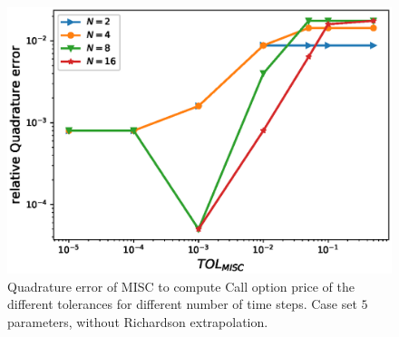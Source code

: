 \documentclass[11pt]{article}
\begin{document}
	\begin{figure}[h!]
		\centering
		\includegraphics[width=0.7\linewidth]{./figures/rBergomi_MISC_quadratre_error/vs_TOL/set5/relative_quad_error_wrt_MISC_TOL_set5_non_rich}
	
	
	\caption{Quadrature error of MISC to compute Call option price of the different tolerances for different number of time steps. Case  set $5$ parameters, without Richardson extrapolation.}
	\label{fig:Quadrature_error_set5}
\end{figure}
\end{document}
